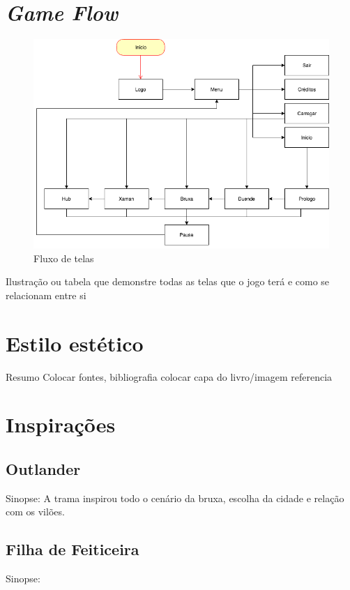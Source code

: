 \section{\textit{Game Flow}}
\begin{figure}[htb]
	\caption{\label{fig_grafico}Fluxo de telas}
	\begin{center}
	    \includegraphics[scale=0.5]{imagens/Flow.png}
	\end{center}
\end{figure}
Ilustração ou tabela que demonstre todas as telas que o jogo terá e como se relacionam entre si

\section{Estilo estético}

Resumo
Colocar fontes, bibliografia colocar capa do livro/imagem referencia

\section{Inspirações}
\subsection{Outlander}
Sinopse: 
A trama inspirou todo o cenário da bruxa, escolha da cidade e relação com os vilões.
\subsection{Filha de Feiticeira}
Sinopse:

